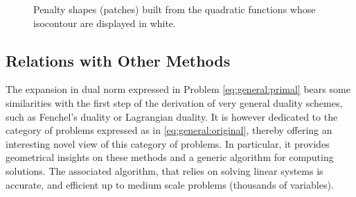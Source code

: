 \ifverylong
% 
% 
\begin{figure}
  \begin{center} 
    \caption{Penalty shapes (patches) built from the quadratic functions whose
             isocontour are displayed in white.}
    \label{fig:penalties}
    \end{center} 
\end{figure}
\fi


\subsection{Relations with Other Methods}

The expansion in dual norm expressed in Problem \eqref{eq:general:primal} bears
some similarities with the first step of the derivation of very general duality
schemes, such as Fenchel's duality or Lagrangian duality.
It is however dedicated to the category of problems expressed as in
\eqref{eq:general:original}, thereby offering an interesting novel view of this
category of problems.
In particular, it provides geometrical insights on these methods and a generic
algorithm for computing solutions.  The associated algorithm, that relies on
solving linear systems is accurate, and efficient up to medium scale problems
(thousands of variables).


